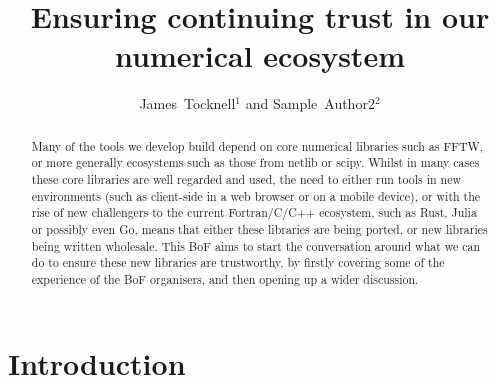 \documentclass[11pt,twoside]{article}
\begin{document}
\title{Ensuring continuing trust in our numerical ecosystem}

\author{James~Tocknell$^1$ and Sample~Author2$^2$}




  
\begin{abstract}

Many of the tools we develop build depend on core numerical libraries such as FFTW, or more generally ecosystems such as those from netlib or scipy. Whilst in many cases these core libraries are well regarded and used, the need to either run tools in new environments (such as client-side in a web browser or on a mobile device), or with the rise of new challengers to the current Fortran/C/C++ ecosystem, such as Rust, Julia or possibly even Go, means that either these libraries are being ported, or new libraries being written wholesale. This BoF aims to start the conversation around what we can do to ensure these new libraries are trustworthy, by firstly covering some of the experience of the BoF organisers, and then opening up a wider discussion.
  
\end{abstract}

\section{Introduction}
\end{document}
